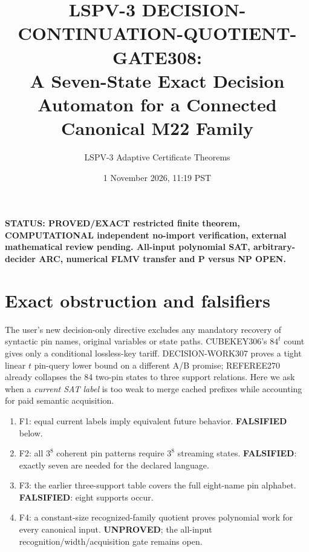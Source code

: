 \documentclass[11pt]{article}
\title{LSPV-3 DECISION-CONTINUATION-QUOTIENT-GATE308:\\ A Seven-State Exact Decision Automaton for a Connected Canonical M22 Family}
\author{LSPV-3 Adaptive Certificate Theorems}
\date{1 November 2026, 11:19 PST}
\begin{document}
\maketitle
\noindent\textbf{STATUS: PROVED/EXACT restricted finite theorem, COMPUTATIONAL independent no-import verification, external mathematical review pending. All-input polynomial SAT, arbitrary-decider ARC, numerical FLMV transfer and P versus NP OPEN.}
\section{Exact obstruction and falsifiers}
The user's new decision-only directive excludes any mandatory recovery of syntactic pin names, original variables or state paths. CUBEKEY306's $84^t$ count gives only a conditional lossless-key tariff. DECISION-WORK307 proves a tight linear $t$ pin-query lower bound on a different A/B promise; REFEREE270 already collapses the 84 two-pin states to three support relations. Here we ask when a \emph{current SAT label} is too weak to merge cached prefixes while accounting for paid semantic acquisition.
\begin{enumerate}
\item[] F1: equal current labels imply equivalent future behavior. \textbf{FALSIFIED} below.
\item[] F2: all $3^8$ coherent pin patterns require $3^8$ streaming states. \textbf{FALSIFIED}: exactly seven are needed for the declared language.
\item[] F3: the earlier three-support table covers the full eight-name pin alphabet. \textbf{FALSIFIED}: eight supports occur.
\item[] F4: a constant-size recognized-family quotient proves polynomial work for every canonical input. \textbf{UNPROVED}; the all-input recognition/width/acquisition gate remains open.
\end{enumerate}
\end{document}
